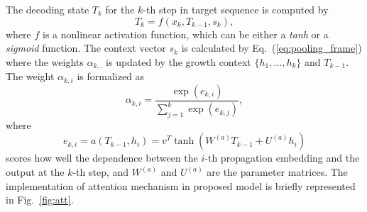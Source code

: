 The decoding state $T_k$ for the $k$-th step in target
sequence is computed by
\begin{equation}
\label{eq:target_embedding}
T_k = f(x_k, T_{k-1}, s_k),
\end{equation}
where 
$f$ is
a nonlinear activation function, which can be either a \textit{tanh} or
a \textit{sigmoid} function. The context vector $s_k$ is calculated by
Eq.~(\ref{eq:pooling_frame}) where the weights $\alpha_{k,.}$ 
is updated by the growth context
$\{h_1,\ldots,h_k\}$ and $T_{k-1}$. The weight $\alpha_{k,i}$ is formalized as
\begin{equation}
\label{eq:alpha}
\alpha_{k,i}=\frac{\exp(e_{k,i})}{\sum_{j=1}^k \exp(e_{k,j})},
\end{equation}
where
\begin{equation}
\label{eq:score}
e_{k,i}=a(T_{k-1}, h_i)=v^T\tanh(W^{(a)} T_{k-1}+U^{(a)} h_i)
\end{equation}
scores how well the dependence between the $i$-th propagation
embedding and the output at the $k$-th step, and $W^{(a)}$ and $U^{(a)}$ are the
parameter matrices. The implementation of attention mechanism in proposed model
is briefly represented in Fig.~\ref{fig:att}.

